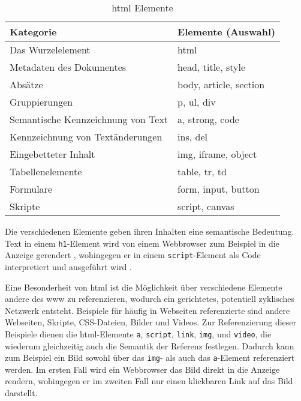             \begin{table}[h]
                \centering
                \begin{tabular}{|l|l|}
                \hline
                \textbf{Kategorie} & \textbf{Elemente (Auswahl)} \\
                \hline
                Das Wurzelelement & html \\
                \hline
                Metadaten des Dokumentes & head, title, style \\
                \hline
                Absätze & body, article, section \\
                \hline
                Gruppierungen & p, ul, div \\
                \hline
                Semantische Kennzeichnung von Text & a, strong, code \\
                \hline
                Kennzeichnung von Textänderungen & ins, del \\
                \hline
                Eingebetteter Inhalt & img, iframe, object \\
                \hline
                Tabellenelemente & table, tr, td \\
                \hline
                Formulare & form, input, button \\
                \hline
                Skripte & script, canvas \\
                \hline
                \end{tabular}
                \caption{\gls{html} Elemente}
                \label{table:htmlElements}
            \end{table}

            Die verschiedenen Elemente geben ihren Inhalten eine semantische Bedeutung.
            Text in einem \texttt{h1}-Element wird von einem Webbrowser zum Beispiel in die Anzeige gerendert
            \cite[Kapitel 4.3.6]{w3c:html5},
            wohingegen er in einem \texttt{script}-Element als Code interpretiert und ausgeführt wird
            \cite[Kapitel 4.11.1]{w3c:html5}.
        
            Eine Besonderheit von \gls{html} ist die Möglichkeit
            über verschiedene Elemente andere {\resources} des \gls{www} zu referenzieren,
            wodurch ein gerichtetes, potentiell zyklisches Netzwerk entsteht.
            Beispiele für häufig in Webseiten referenzierte {\resources}
            sind andere Webseiten, Skripte, CSS-Dateien, Bilder und Videos.
            Zur Referenzierung dieser Beispiele dienen die \gls{html}-Elemente
            \texttt{a}, \texttt{script}, \texttt{link}, \texttt{img}, und \texttt{video},
            die wiederum gleichzeitig auch die Semantik der Referenz festlegen.
            Dadurch kann zum Beispiel ein Bild sowohl über das \texttt{img}-
            als auch das \texttt{a}-Element referenziert werden.
            Im ersten Fall wird ein Webbrowser das Bild direkt in die Anzeige rendern,
            wohingegen er im zweiten Fall nur einen klickbaren Link auf das Bild darstellt.

